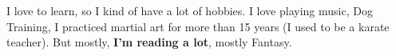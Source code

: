 

\begin{cvparagraph}

I love to learn, so I kind of have a lot of hobbies.
I love playing music, Dog Training, I practiced martial art for more than 15 years (I used to be a karate teacher).
But mostly, \textbf{I'm reading a lot}, mostly Fantasy.

\end{cvparagraph}
